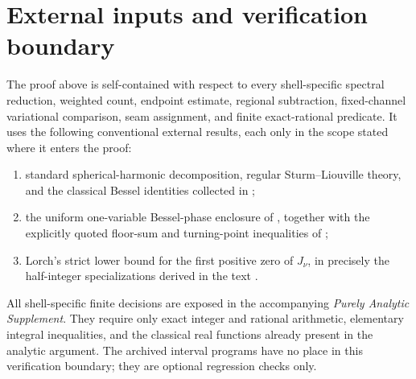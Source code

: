 \documentclass[11pt]{article}
\numberwithin{equation}{section}
\theoremstyle{definition}
\theoremstyle{remark}
\begin{document}
\appendix

\section{External inputs and verification boundary}
\label{app:external-boundary}

The proof above is self-contained with respect to every shell-specific
spectral reduction, weighted count, endpoint estimate, regional subtraction,
fixed-channel variational comparison, seam assignment, and finite
exact-rational predicate.  It uses the following conventional external results, each only
in the scope stated where it enters the proof:
\begin{enumerate}
  \item standard spherical-harmonic decomposition, regular
        Sturm--Liouville theory, and the classical Bessel identities collected
        in \cite{DLMF};
  \item the uniform one-variable Bessel-phase enclosure of
        \cite{FLPSphase}, together with the explicitly quoted floor-sum and
        turning-point inequalities of \cite{FLPSballs,FLPSannuli};
  \item Lorch's strict lower bound for the first positive zero of
        \(J_\nu\), in precisely the half-integer specializations derived in
        the text \cite{Lorch1993}.
\end{enumerate}

All shell-specific finite decisions are exposed in the accompanying
\emph{Purely Analytic Supplement}.  They require only exact integer and
rational arithmetic, elementary integral inequalities, and the classical
real functions already present in the analytic argument.  The archived
interval programs have no place in this verification boundary; they are
optional regression checks only.
\end{document}
